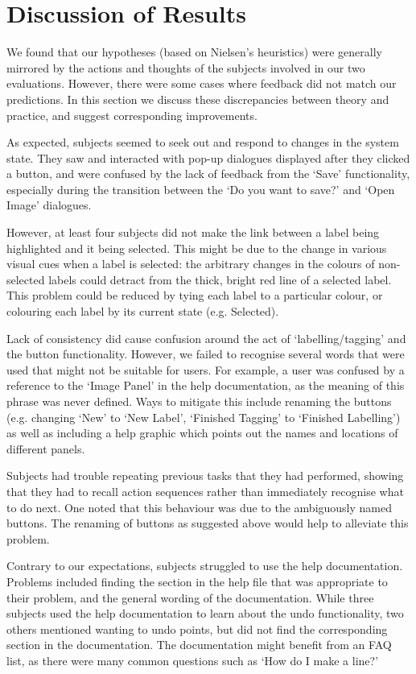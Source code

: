\documentclass[11pt,twocolumn]{article}
\begin{document}
\section{Discussion of Results}

We found that our hypotheses (based on Nielsen's heuristics) were generally
mirrored by the actions and thoughts of the subjects involved in our two
evaluations. However, there were some cases where feedback did not match our
predictions. In this section we discuss these discrepancies between theory and
practice, and suggest corresponding improvements.

As expected, subjects seemed to seek out and respond to changes in the system
state. They saw and interacted with pop-up dialogues displayed after they
clicked a button, and were confused by the lack of feedback from the `Save'
functionality, especially during the transition between the `Do you want to
save?' and `Open Image' dialogues. 

However, at least four subjects did not make the link between a label being
highlighted and it being selected. This might be due to the change in various
visual cues when a label is selected: the arbitrary changes in the colours of
non-selected labels could detract from the thick, bright red line of a selected
label. This problem could be reduced by tying each label to a particular
colour, or colouring each label by its current state (e.g. Selected).

Lack of consistency did cause confusion around the act of `labelling/tagging'
and the button functionality. However, we failed to recognise several words
that were used that might not be suitable for users. For example, a user was
confused by a reference to the `Image Panel' in the help documentation, as the
meaning of this phrase was never defined. Ways to mitigate this include
renaming the buttons (e.g. changing `New' to `New Label', `Finished Tagging' to
`Finished Labelling') as well as including a help graphic which points out the
names and locations of different panels.

Subjects had trouble repeating previous tasks that they had performed, showing
that they had to recall action sequences rather than immediately recognise
what to do next. One noted that this behaviour was due to the ambiguously named
buttons. The renaming of buttons as suggested above would help to alleviate
this problem. 
 
Contrary to our expectations, subjects struggled to use the help documentation.
Problems included finding the section in the help file that was appropriate to
their problem, and the general wording of the documentation. While three
subjects used the help documentation to learn about the undo functionality, two
others mentioned wanting to undo points, but did not find the corresponding
section in the documentation. The documentation might benefit from an FAQ list,
as there were many common questions such as `How do I make a line?'
\end{document}
